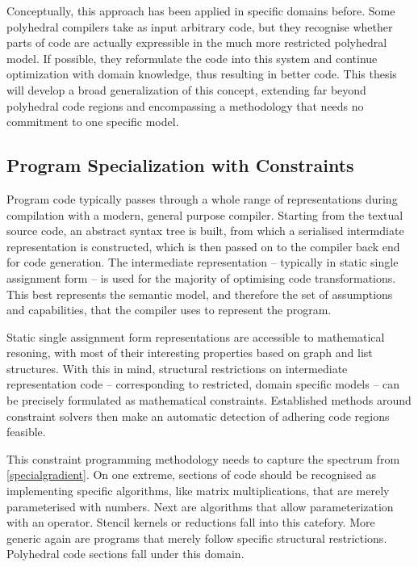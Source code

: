     Conceptually, this approach has been applied in specific domains before.
    Some polyhedral compilers take as input arbitrary code, but they recognise
    whether parts of code are actually expressible in the much more restricted
    polyhedral model.
    If possible, they reformulate the code into this system and continue
    optimization with domain knowledge, thus resulting in better code.
    This thesis will develop a broad generalization of this concept, extending
    far beyond polyhedral code regions and encompassing a methodology that
    needs no commitment to one specific model.

\subsection{Program Specialization with Constraints}

    Program code typically passes through a whole range of representations
    during compilation with a modern, general purpose compiler.
    Starting from the textual source code, an abstract syntax tree is built,
    from which a serialised intermdiate representation is constructed,
    which is then passed on to the compiler back end for code generation.
    The intermediate representation -- typically in static single assignment
    form -- is used for the majority of optimising code transformations.
    This best represents the semantic model, and therefore the set of
    assumptions and capabilities, that the compiler uses to represent the
    program.

    Static single assignment form representations are accessible to mathematical
    resoning, with most of their interesting properties based on graph and list
    structures.
    With this in mind, structural restrictions on intermediate representation
    code -- corresponding to restricted, domain specific models -- can be
    precisely formulated as mathematical constraints.
    Established methods around constraint solvers then make an automatic
    detection of adhering code regions feasible.

    This constraint programming methodology needs to capture the spectrum from
    \autoref{specialgradient}.
    On one extreme, sections of code should be recognised as implementing
    specific algorithms, like matrix multiplications, that are merely
    parameterised with numbers.
    Next are algorithms that allow parameterization with an operator.
    Stencil kernels or reductions fall into this catefory.
    More generic again are programs that merely follow specific structural
    restrictions.
    Polyhedral code sections fall under this domain.

